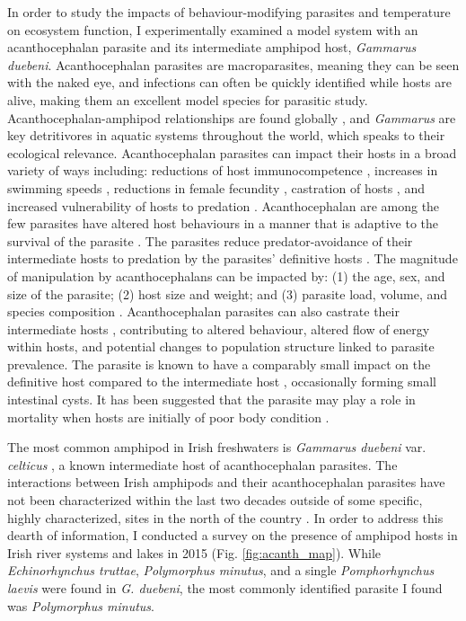 In order to study the impacts of behaviour-modifying parasites and temperature on ecosystem function, I experimentally examined a model system with an acanthocephalan parasite and its intermediate amphipod host, \emph{Gammarus duebeni}. Acanthocephalan parasites are macroparasites, meaning they can be seen with the naked eye, and infections can often be quickly identified while hosts are alive, making them an excellent model species for parasitic study. Acanthocephalan-amphipod relationships are found globally \citep{hynes1958, tokeson1982}, and \emph{Gammarus} are key detritivores in aquatic systems throughout the world, which speaks to their ecological relevance. Acanthocephalan parasites can impact their hosts in a broad variety of ways including: reductions of host immunocompetence \citep{rigaud2003},  increases in swimming speeds \citep{medoc2008}, reductions in female fecundity \citep{dezfuli1999}, castration of hosts \citep{bailly2017},  and increased vulnerability of hosts  to predation \citep{lagrue2007}. Acanthocephalan are among the few parasites have altered host behaviours in a manner that is adaptive to the survival of the parasite \citep{poulin1995}. The parasites reduce predator-avoidance of their intermediate hosts to predation by the parasites’ definitive hosts \citep{jacquin2014}. The magnitude of manipulation by acanthocephalans can be impacted by: (1) the age, sex, and size of the parasite; (2) host size and weight; and (3) parasite load, volume, and species composition \citep{labaude2015host}. Acanthocephalan parasites can also castrate their intermediate hosts \citep{kakizaki2003,bailly2017}, contributing to altered behaviour, altered flow of energy within hosts, and potential changes to population structure linked to parasite prevalence. The parasite is known to have a comparably small impact on the definitive host compared to the intermediate host \citep{nicholas19582}, occasionally forming small intestinal cysts. It has been suggested that the parasite may play a role in mortality when hosts are initially of poor body condition \citep{itamies1980}.

The most common amphipod in Irish freshwaters is \emph{Gammarus duebeni} var. \emph{celticus} \citep{reid1938,macneil2009}, a known intermediate host of acanthocephalan parasites. The interactions between Irish amphipods and their acanthocephalan parasites have not been characterized within the last two decades outside of some specific, highly characterized, sites in the north of the country \citep{dick1993,lyndon1996,dunn1998}. In order to address this dearth of information, I conducted a survey on the presence of amphipod hosts in Irish river systems and lakes in 2015 (Fig. \ref{fig:acanth_map}). While \emph{Echinorhynchus truttae}, \emph{Polymorphus minutus}, and a single \emph{Pomphorhynchus laevis} were found in \emph{G. duebeni}, the most commonly identified parasite I found was \emph{Polymorphus minutus}. 

